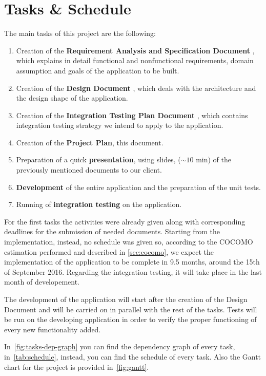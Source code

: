 \section{Tasks \& Schedule}

The main tasks of this project are the following:
\begin{enumerate}
    \item Creation of the \textbf{Requirement Analysis and Specification Document} \cite{bib:rasd}, which explains in detail functional and nonfunctional requirements, domain assumption and goals of the application to be built.
    \item Creation of the \textbf{Design Document} \cite{bib:dd}, which deals with the architecture and the design shape of the application.
    \item Creation of the \textbf{Integration Testing Plan Document} \cite{bib:itpd}, which contains integration testing strategy we intend to apply to the application.
    \item Creation of the \textbf{Project Plan}, this document.
    \item Preparation of a quick \textbf{presentation}, using slides, ($\sim 10$ min) of the previously mentioned documents to our client.
    \item \textbf{Development} of the entire application and the preparation of the unit tests.
    \item Running of \textbf{integration testing} on the application.
\end{enumerate}

For the first tasks the activities were already given along with corresponding deadlines for the submission of needed documents. Starting from the implementation, instead, no schedule was given so, according to the COCOMO estimation performed and described in \ref{sec:cocomo}, we expect the implementation of the application to be complete in 9.5 months, around the 15th of September 2016.
Regarding the integration testing, it will take place in the last month of developement.

The development of the application will start after the creation of the Design Document and will be carried on in parallel with the rest of the tasks.
Tests will be run on the developing application in order to verify the proper functioning of every new functionality added.

In~\autoref{fig:tasks-dep-graph} you can find the dependency graph of every task, in~\autoref{tab:schedule}, instead, you can find the schedule of every task. Also the Gantt chart for the project is provided in~\autoref{fig:gantt}.


